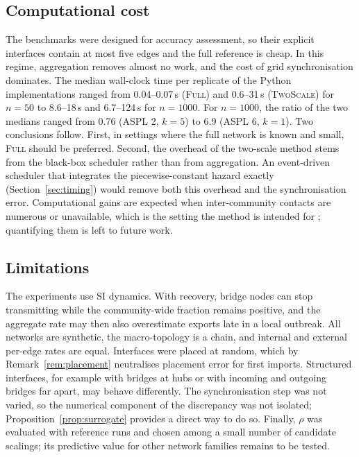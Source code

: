 \documentclass[a4paper,fleqn]{cas-sc}
\newcommand{\Full}{\textup{\textsc{Full}}}
\newcommand{\TS}{\textup{\textsc{TwoScale}}}
\begin{document}
\subsection{Computational cost}
\label{sec:disc_cost}

The benchmarks were designed for accuracy assessment, so their explicit interfaces contain at most five edges and the full reference is cheap. In this regime, aggregation removes almost no work, and the cost of grid synchronisation dominates. The median wall-clock time per replicate of the Python implementations ranged from 0.04--0.07\,s (\Full{}) and 0.6--31\,s (\TS{}) for $n=50$ to 8.6--18\,s and 6.7--124\,s for $n=1000$. For $n=1000$, the ratio of the two medians ranged from 0.76 (ASPL 2, $k=5$) to 6.9 (ASPL 6, $k=1$). Two conclusions follow. First, in settings where the full network is known and small, \Full{} should be preferred. Second, the overhead of the two-scale method stems from the black-box scheduler rather than from aggregation. An event-driven scheduler that integrates the piecewise-constant hazard exactly (Section~\ref{sec:timing}) would remove both this overhead and the synchronisation error. Computational gains are expected when inter-community contacts are numerous or unavailable, which is the setting the method is intended for \citep{kuryliak2025towards}; quantifying them is left to future work.

\subsection{Limitations}

The experiments use SI dynamics. With recovery, bridge nodes can stop transmitting while the community-wide fraction remains positive, and the aggregate rate may then also overestimate exports late in a local outbreak. All networks are synthetic, the macro-topology is a chain, and internal and external per-edge rates are equal. Interfaces were placed at random, which by Remark~\ref{rem:placement} neutralises placement error for first imports. Structured interfaces, for example with bridges at hubs or with incoming and outgoing bridges far apart, may behave differently. The synchronisation step was not varied, so the numerical component of the discrepancy was not isolated; Proposition~\ref{prop:surrogate} provides a direct way to do so. Finally, $\rho$ was evaluated with reference runs and chosen among a small number of candidate scalings; its predictive value for other network families remains to be tested.
\end{document}
